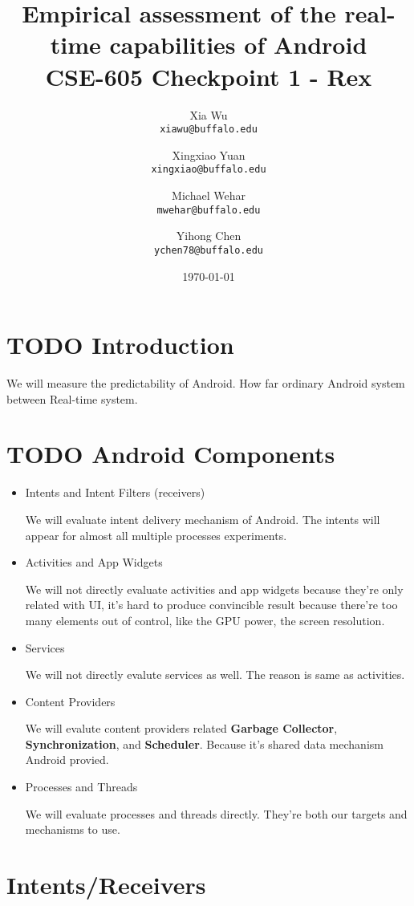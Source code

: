 \documentclass[11pt]{article}
\author{Xia Wu\\ \texttt{xiawu@buffalo.edu} \and Xingxiao Yuan\\ \texttt{xingxiao@buffalo.edu} \and Michael Wehar\\ \texttt{mwehar@buffalo.edu} \and Yihong Chen\\ \texttt{ychen78@buffalo.edu}}
\date{\today}
\title{Empirical assessment of the real-time capabilities of Android\\\large CSE-605 Checkpoint 1 - Rex}
\begin{document}
\maketitle
\tableofcontents


\section{{\bfseries\sffamily TODO} Introduction}
\label{sec-1}
We will measure the predictability of Android.
How far ordinary Android system between Real-time system.

\section{{\bfseries\sffamily TODO} Android Components}
\label{sec-2}
\begin{itemize}
\item Intents and Intent Filters (receivers)

We will evaluate intent delivery mechanism of Android.
The intents will appear for almost all multiple processes experiments.

\item Activities and App Widgets

We will not directly evaluate activities and app widgets because they're only related with UI,
it's hard to produce convincible result because there're too many elements out of control,
like the GPU power, the screen resolution.

\item Services

We will not directly evalute services as well. The reason is same as activities.
\item Content Providers

We will evalute content providers related \textbf{Garbage Collector}, \textbf{Synchronization},
and \textbf{Scheduler}. Because it's shared data mechanism Android provied.
\end{itemize}


\begin{itemize}
\item Processes and Threads

We will evaluate processes and threads directly.
They're both our targets and mechanisms to use.
\end{itemize}

\section{Intents/Receivers}
\label{sec-3}
\end{document}
